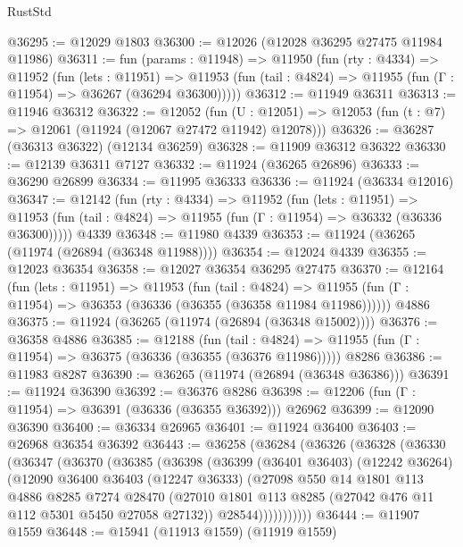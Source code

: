 \begin{lexlean}{RustStd}
\begin{coremodule}
{\begin{coremodule}
{{{{{{{{{{{{{{{{{{{{{{{{{{{{{{{{{{{{{{{{{{{{{{{{{{{{{{{{{{{{{{{{{{{{{{{{{{{{{{{{@36295 := @12029 @1803
@36300 := @12026 (@12028 @36295 @27475 @11984 @11986)
@36311 := fun (params : @11948) =>
  @11950
    (fun (rty : @4334) =>
    @11952
      (fun (lets : @11951) =>
      @11953 (fun (tail : @4824) => @11955 (fun (Γ : @11954) => @36267 (@36294 @36300)))))
@36312 := @11949 @36311
@36313 := @11946 @36312
@36322 := @12052
    (fun (U : @12051) => @12053 (fun (t : @7) => @12061 (@11924 (@12067 @27472 @11942) @12078)))
@36326 := @36287 (@36313 @36322) (@12134 @36259)
@36328 := @11909 @36312 @36322
@36330 := @12139 @36311 @7127
@36332 := @11924 (@36265 @26896)
@36333 := @36290 @26899
@36334 := @11995 @36333
@36336 := @11924 (@36334 @12016)
@36347 := @12142
    (fun (rty : @4334) =>
    @11952
      (fun (lets : @11951) =>
      @11953 (fun (tail : @4824) => @11955 (fun (Γ : @11954) => @36332 (@36336 @36300)))))
    @4339
@36348 := @11980 @4339
@36353 := @11924 (@36265 (@11974 (@26894 (@36348 @11988))))
@36354 := @12024 @4339
@36355 := @12023 @36354
@36358 := @12027 @36354 @36295 @27475
@36370 := @12164
    (fun (lets : @11951) =>
    @11953
      (fun (tail : @4824) =>
      @11955 (fun (Γ : @11954) => @36353 (@36336 (@36355 (@36358 @11984 @11986))))))
    @4886
@36375 := @11924 (@36265 (@11974 (@26894 (@36348 @15002))))
@36376 := @36358 @4886
@36385 := @12188
    (fun (tail : @4824) => @11955 (fun (Γ : @11954) => @36375 (@36336 (@36355 (@36376 @11986)))))
    @8286
@36386 := @11983 @8287
@36390 := @36265 (@11974 (@26894 (@36348 @36386)))
@36391 := @11924 @36390
@36392 := @36376 @8286
@36398 := @12206 (fun (Γ : @11954) => @36391 (@36336 (@36355 @36392))) @26962
@36399 := @12090 @36390
@36400 := @36334 @26965
@36401 := @11924 @36400
@36403 := @26968 @36354 @36392
@36443 := @36258
    (@36284
      (@36326
        (@36328
          (@36330
            (@36347
              (@36370
                (@36385
                  (@36398
                    (@36399
                      (@36401 @36403)
                      (@12242 @36264)
                      (@12090
                        @36400
                        @36403
                        (@12247 @36333)
                        (@27098
                          @550
                          @14
                          @1801
                          @113
                          @4886
                          @8285
                          @7274
                          @28470
                          (@27010 @1801 @113 @8285 (@27042 @476 @11 @112 @5301 @5450 @27058 @27132))
                          @28544)))))))))))
@36444 := @11907 @1559
@36448 := @15941 (@11913 @1559) (@11919 @1559)
}}}}}}}}}}}}}}}}}}}}}}}}}}}}}}}}}}}}}}}}}}}}}}}}}}}}}}}}}}}}}}}}}}}}}}}}}}}}}}}}
\end{coremodule}}
\end{coremodule}
\end{lexlean}

